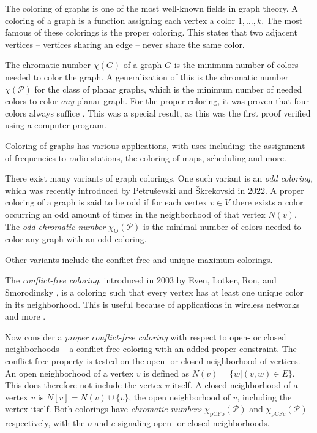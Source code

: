 \documentclass{article}
\begin{document}
The coloring of graphs is one of the most well-known fields in graph theory. A coloring of a graph is a function assigning each vertex a color $1, \dots, k$. The most famous of these colorings is the proper coloring. This states that two adjacent vertices -- vertices sharing an edge -- never share the same color. 

The chromatic number $\chi(G)$ of a graph $G$ is the minimum number of colors needed to color the graph. A generalization of this is the chromatic number $\chi(\mathcal{P})$ for the class of planar graphs, which is the minimum number of needed colors to color \textit{any} planar graph. For the proper coloring, it was proven that four colors always suffice \cite{appel1976every}. This was a special result, as this was the first proof verified using a computer program.

Coloring of graphs has various applications, with uses including: the assignment of frequencies to radio stations, the coloring of maps, scheduling and more.

There exist many variants of graph colorings. One such variant is an \textit{odd coloring}, which was recently introduced by Petruševski and Škrekovski \cite{PETRUSEVSKI2022385} in $2022$. A proper coloring of a graph is said to be odd if for each vertex $v \in V$ there exists a color occurring an odd amount of times in the neighborhood of that vertex $N(v)$. The \textit{odd chromatic number} $\chi_{\mathrm{O}}(\mathcal{P})$ is the minimal number of colors needed to color any graph with an odd coloring.

Other variants include the conflict-free and unique-maximum colorings. 

The \textit{conflict-free coloring}, introduced in 2003 by Even, Lotker, Ron, and Smorodinsky \cite{even2003conflict}, is a coloring such that every vertex has at least one unique color in its neighborhood. This is useful because of applications in wireless networks and more \cite{smorodinsky2013conflict}.

Now consider a \textit{proper conflict-free coloring} with respect to open- or closed neighborhoods -- a conflict-free coloring with an added proper constraint. The conflict-free property is tested on the open- or closed neighborhood of vertices. 
An open neighborhood of a vertex $v$ is defined as $N(v) = \{w | (v, w) \in E\}$. This does therefore not include the vertex $v$ itself. A closed neighborhood of a vertex $v$ is $N[v] = N(v) \cup \{v\}$, the open neighborhood of $v$, including the vertex itself. 
Both colorings have \textit{chromatic numbers} $\chi_{\mathrm{pCFo}}(\mathcal{P})$ and $\chi_{\mathrm{pCFc}}(\mathcal{P})$ respectively, with the $o$ and $c$ signaling open- or closed neighborhoods.
\end{document}

